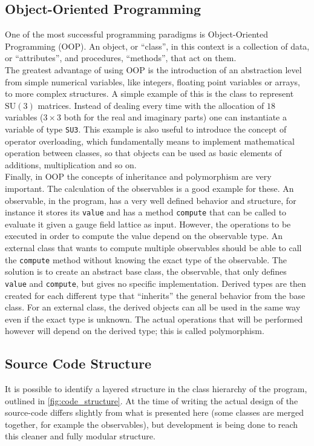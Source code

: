 \subsection{Object-Oriented Programming}
One of the most successful programming paradigms is Object-Oriented Programming (OOP). An object, or ``class'', in this context is a collection of data, or ``attributes'', and procedures, ``methods'', that act on them. \\
The greatest advantage of using OOP is the introduction of an abstraction level from simple numerical variables, like integers, floating point variables or arrays, to more complex structures. A simple example of this is the class to represent $\mathrm{SU}(3)$ matrices. Instead of dealing every time with the allocation of $18$ variables ($3\times 3$ both for the real and imaginary parts) one can instantiate a variable of type \texttt{SU3}. This example is also useful to introduce the concept of operator overloading, which fundamentally means to implement mathematical operation between classes, so that objects can be used as basic elements of additions, multiplication and so on.\\
Finally, in OOP the concepts of inheritance and polymorphism are very important. The calculation of the observables is a good example for these. An observable, in the program, has a very well defined behavior and structure, for instance it stores its \texttt{value} and has a method \texttt{compute} that can be called to evaluate it given a gauge field lattice as input. However, the operations to be executed in order to compute the value depend on the observable type. An external class that wants to compute multiple observables should be able to call the \texttt{compute} method without knowing the exact type of the observable. The solution is to create an abstract base class, the observable, that only defines \texttt{value} and \texttt{compute}, but gives no specific implementation. Derived types are then created for each different type that ``inherits'' the general behavior from the base class. For an external class, the derived objects can all be used in the same way even if the exact type is unknown. The actual operations that will be performed however will depend on the derived type; this is called polymorphism.\\

\subsection{Source Code Structure}
It is possible to identify a layered structure in the class hierarchy of the program, outlined in \cref{fig:code_structure}. At the time of writing the actual design of the source-code  differs slightly from what is presented here (some classes are merged together, for example the observables), but development is being done to reach this cleaner and fully modular structure.\\

